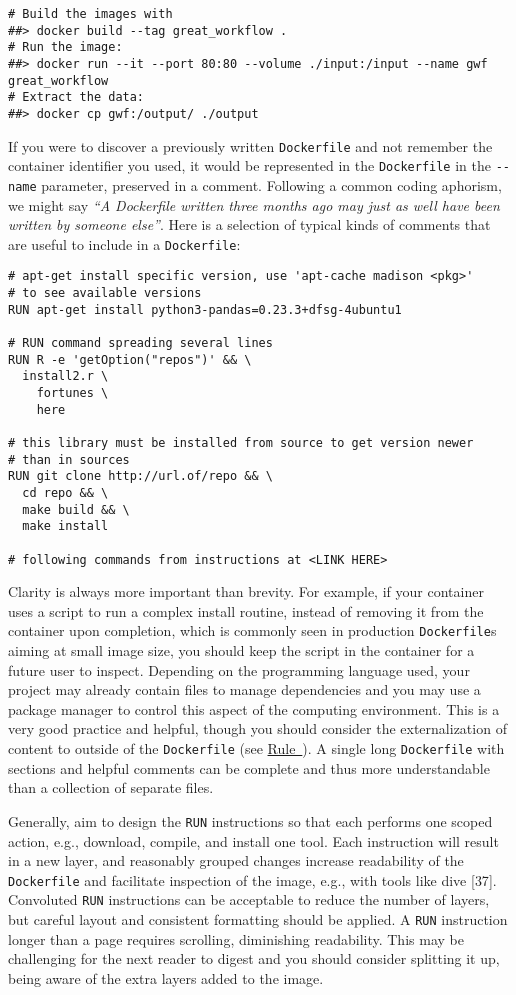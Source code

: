 \documentclass[10pt,letterpaper]{article}
\begin{document}
\begin{verbatim}
# Build the images with
##> docker build --tag great_workflow .
# Run the image:
##> docker run --it --port 80:80 --volume ./input:/input --name gwf great_workflow
# Extract the data:
##> docker cp gwf:/output/ ./output
\end{verbatim}

If you were to discover a previously written \texttt{Dockerfile} and not
remember the container identifier you used, it would be represented in
the \texttt{Dockerfile} in the \texttt{-\/-name} parameter, preserved in
a comment. Following a common coding aphorism, we might say \emph{``A
Dockerfile written three months ago may just as well have been written
by someone else''}. Here is a selection of typical kinds of comments
that are useful to include in a \texttt{Dockerfile}:

\begin{verbatim}
# apt-get install specific version, use 'apt-cache madison <pkg>' 
# to see available versions
RUN apt-get install python3-pandas=0.23.3+dfsg-4ubuntu1

# RUN command spreading several lines
RUN R -e 'getOption("repos")' && \
  install2.r \
    fortunes \
    here

# this library must be installed from source to get version newer
# than in sources
RUN git clone http://url.of/repo && \
  cd repo && \
  make build && \
  make install

# following commands from instructions at <LINK HERE>
\end{verbatim}

Clarity is always more important than brevity. For example, if your
container uses a script to run a complex install routine, instead of
removing it from the container upon completion, which is commonly seen
in production \texttt{Dockerfile}s aiming at small image size, you
should keep the script in the container for a future user to inspect.
Depending on the programming language used, your project may already
contain files to manage dependencies and you may use a package manager
to control this aspect of the computing environment. This is a very good
practice and helpful, though you should consider the externalization of
content to outside of the \texttt{Dockerfile} (see
\hyperref[{rule:mount}]{Rule~\ztitleref{rule:mount}}). A single long
\texttt{Dockerfile} with sections and helpful comments can be complete
and thus more understandable than a collection of separate files.

Generally, aim to design the \texttt{RUN} instructions so that each
performs one scoped action, e.g., download, compile, and install one
tool. Each instruction will result in a new layer, and reasonably
grouped changes increase readability of the \texttt{Dockerfile} and
facilitate inspection of the image, e.g., with tools like dive {[}37{]}.
Convoluted \texttt{RUN} instructions can be acceptable to reduce the
number of layers, but careful layout and consistent formatting should be
applied. A \texttt{RUN} instruction longer than a page requires
scrolling, diminishing readability. This may be challenging for the next
reader to digest and you should consider splitting it up, being aware of
the extra layers added to the image.
\end{document}
